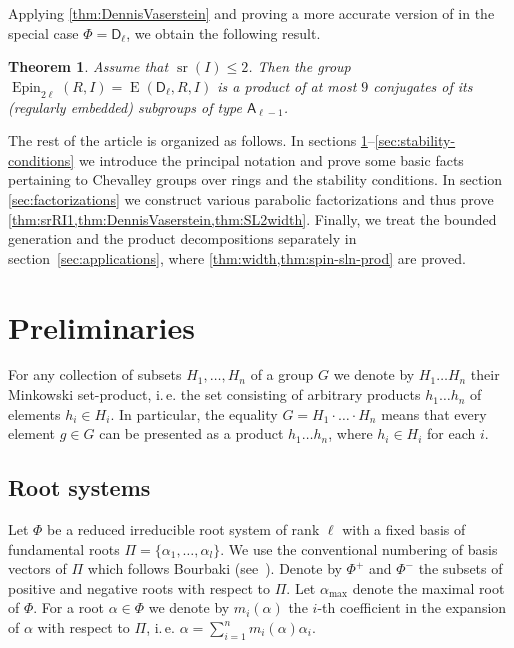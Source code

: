 \documentclass[oneside, 12pt]{amsart}
\theoremstyle{plain}
\newtheorem{thm}{Theorem}
\numberwithin{equation}{section}
\numberwithin{lemma}{section}
\theoremstyle{definition}
\theoremstyle{remark}
\DeclareMathOperator{\E}{E}
\DeclareMathOperator{\sr}{sr}
\DeclareMathOperator{\Epin}{Epin}
\newcommand{\rA}{\mathsf{A}}
\newcommand{\rD}{\mathsf{D}}
\begin{document}
Applying \cref{thm:DennisVaserstein} and proving a more accurate version of \cite[Proposition~1]{Nik07} in the special case $\Phi=\rD_\ell$, we obtain the following result.
\begin{thm}\label{thm:spin-sln-prod}
Assume that $\sr(I) \leqslant 2$. Then the group $\Epin_{2\ell}(R, I)=\E(\rD_\ell, R, I)$ is a product of at most $9$ conjugates of its (regularly embedded) subgroups of type $\rA_{\ell-1}$.
\end{thm}

The rest of the article is organized as follows.
In sections \ref{sec:prelim}--\ref{sec:stability-conditions} we introduce the principal notation and prove some basic facts pertaining to Chevalley groups over rings and the stability conditions.
In section \ref{sec:factorizations} we construct various parabolic factorizations and thus prove \cref{thm:srRI1,thm:DennisVaserstein,thm:SL2width}.
Finally, we treat the bounded generation and the product decompositions separately in section~\ref{sec:applications}, where \cref{thm:width,thm:spin-sln-prod} are proved.

\section{Preliminaries}\label{sec:prelim}
For any collection of subsets $H_1, \ldots, H_n$ of a group $G$ we denote by $H_1\ldots H_n$ their Minkowski set-product, 
i.\,e. the set consisting of arbitrary products $h_1\ldots h_n$ of elements $h_i\in H_i$. In particular, the equality
$G = H_1\cdot\ldots\cdot H_n$ means that every element $g\in G$ can be presented as a product $h_1\ldots h_n$, where $h_i\in H_i$ for each $i$.

\subsection{Root systems}\label{sec:rootsys}
Let $\Phi$ be a reduced irreducible root system of rank $\ell$ with a fixed basis of fundamental roots $\Pi=\{\alpha_1, \ldots, \alpha_l\}$.
We use the conventional numbering of basis vectors of $\Pi$ which follows Bourbaki (see~\cite[Table~1]{PSV98}).
Denote by $\Phi^+$ and $\Phi^-$ the subsets of positive and negative roots with respect to $\Pi$.
Let $\alpha_\mathrm{max}$ denote the maximal root of $\Phi$.
For a root $\alpha\in\Phi$ we denote by $m_i(\alpha)$ the $i$-th coefficient in the expansion of $\alpha$ with respect to $\Pi$, i.\,e. $\alpha = \sum_{i=1}^n m_i(\alpha) \alpha_i$.
\end{document}
